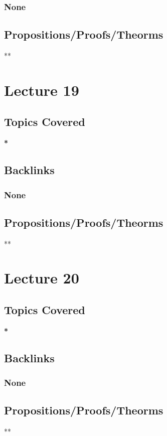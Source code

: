 \documentclass[11pt]{article}
\begin{document}
\subsubsection*{None}
\label{sec:org3fd4ce6}
\subsection*{Propositions/Proofs/Theorms}
\label{sec:orga874ad7}
**

\section*{Lecture 19}
\label{sec:org3f72a43}
\subsection*{Topics Covered}
\label{sec:org2acb308}
\textbf{*}
\subsection*{Backlinks}
\label{sec:org7bece5c}
\subsubsection*{None}
\label{sec:orgfd71172}
\subsection*{Propositions/Proofs/Theorms}
\label{sec:org593dd4a}
**

\section*{Lecture 20}
\label{sec:org83faa90}
\subsection*{Topics Covered}
\label{sec:orga08e7e5}
\textbf{*}
\subsection*{Backlinks}
\label{sec:orgc4295b7}
\subsubsection*{None}
\label{sec:orga434b90}
\subsection*{Propositions/Proofs/Theorms}
\label{sec:org63d6000}
**
\end{document}
